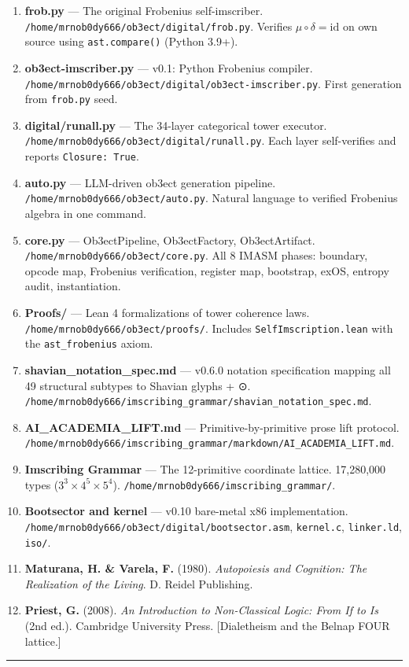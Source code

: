 \documentclass[12pt,a4paper]{article}
\begin{document}
\begin{enumerate}
    \item \textbf{frob.py} --- The original Frobenius self-imscriber. \texttt{/home/mrnob0dy666/ob3ect/digital/frob.py}. Verifies $\mu\circ\delta = \mathrm{id}$ on own source using \texttt{ast.compare()} (Python 3.9+).
    \item \textbf{ob3ect-imscriber.py} --- v0.1: Python Frobenius compiler. \texttt{/home/mrnob0dy666/ob3ect/digital/ob3ect-imscriber.py}. First generation from \texttt{frob.py} seed.
    \item \textbf{digital/runall.py} --- The 34-layer categorical tower executor. \texttt{/home/mrnob0dy666/ob3ect/digital/runall.py}. Each layer self-verifies and reports \texttt{Closure: True}.
    \item \textbf{auto.py} --- LLM-driven ob3ect generation pipeline. \texttt{/home/mrnob0dy666/ob3ect/auto.py}. Natural language to verified Frobenius algebra in one command.
    \item \textbf{core.py} --- Ob3ectPipeline, Ob3ectFactory, Ob3ectArtifact. \texttt{/home/mrnob0dy666/ob3ect/core.py}. All 8 IMASM phases: boundary, opcode map, Frobenius verification, register map, bootstrap, exOS, entropy audit, instantiation.
    \item \textbf{Proofs/} --- Lean 4 formalizations of tower coherence laws. \texttt{/home/mrnob0dy666/ob3ect/proofs/}. Includes \texttt{SelfImscription.lean} with the \texttt{ast\_frobenius} axiom.
    \item \textbf{shavian\_notation\_spec.md} --- v0.6.0 notation specification mapping all 49 structural subtypes to Shavian glyphs + ⊙. \texttt{/home/mrnob0dy666/imscribing\_grammar/shavian\_notation\_spec.md}.
    \item \textbf{AI\_ACADEMIA\_LIFT.md} --- Primitive-by-primitive prose lift protocol. \texttt{/home/mrnob0dy666/imscribing\_grammar/markdown/AI\_ACADEMIA\_LIFT.md}.
    \item \textbf{Imscribing Grammar} --- The 12-primitive coordinate lattice. 17,280,000 types ($3^3 \times 4^5 \times 5^4$). \texttt{/home/mrnob0dy666/imscribing\_grammar/}.
    \item \textbf{Bootsector and kernel} --- v0.10 bare-metal x86 implementation. \texttt{/home/mrnob0dy666/ob3ect/digital/bootsector.asm}, \texttt{kernel.c}, \texttt{linker.ld}, \texttt{iso/}.
    \item \textbf{Maturana, H. \& Varela, F.} (1980). \emph{Autopoiesis and Cognition: The Realization of the Living}. D. Reidel Publishing.
    \item \textbf{Priest, G.} (2008). \emph{An Introduction to Non-Classical Logic: From If to Is} (2nd ed.). Cambridge University Press. {[}Dialetheism and the Belnap FOUR lattice.{]}
\end{enumerate}

\begin{center}
\rule{0.5\textwidth}{0.4pt}
\end{center}
\end{document}
